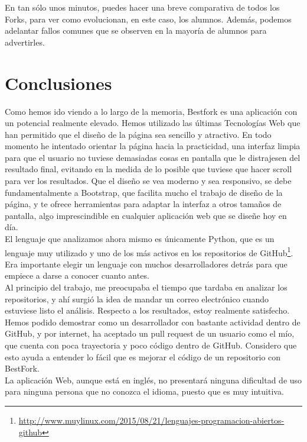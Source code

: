 \documentclass[a4paper, 12pt]{book}
\begin{document}
En tan sólo unos minutos, puedes hacer una breve comparativa de todos los Forks, para ver como evolucionan, en este caso, los alumnos. Además, podemos adelantar fallos comunes que se observen en la mayoría de alumnos para advertirles.\\









\cleardoublepage
\chapter{Conclusiones}
\label{chap:conclusiones}

Como hemos ido viendo a lo largo de la memoria, Bestfork es una aplicación con un potencial realmente elevado. Hemos utilizado las últimas Tecnologías Web que han permitido que el diseño de la página sea sencillo y atractivo. En todo momento he intentado orientar la página hacia la practicidad, una interfaz limpia para que el usuario no tuviese demasiadas cosas en pantalla que le distrajesen del resultado final, evitando en la medida de lo posible que tuviese que hacer scroll para ver los resultados. Que el diseño se vea moderno y sea responsivo, se debe fundamentalmente a Bootstrap, que facilita mucho el trabajo de diseño de la página, y te ofrece herramientas para adaptar la interfaz a otros tamaños de pantalla, algo imprescindible en cualquier aplicación web que se diseñe hoy en día.\\ 
El lenguaje que analizamos ahora mismo es únicamente Python, que es un lenguaje muy utilizado y uno de los más activos en los repositorios de GitHub\footnote{\url{http://www.muylinux.com/2015/08/21/lenguajes-programacion-abiertos-github}}. Era importante elegir un lenguaje con muchos desarrolladores detrás para que empiece a darse a conocer cuanto antes.\\
Al principio del trabajo, me preocupaba el tiempo que tardaba en analizar los repositorios, y ahí surgió la idea de mandar un correo electrónico cuando estuviese listo el análisis.
Respecto a los resultados, estoy realmente satisfecho. Hemos podido demostrar como un desarrollador con bastante actividad dentro de GitHub, y por internet, ha aceptado un pull request de un usuario como el mío, que cuenta con poca trayectoria y poco código dentro de GitHub. Considero que esto ayuda a entender lo fácil que es mejorar el código de un repositorio con BestFork. \\
La aplicación Web, aunque está en inglés, no presentará ninguna dificultad de uso para ninguna persona que no conozca el idioma, puesto que es muy intuitiva.
\end{document}
